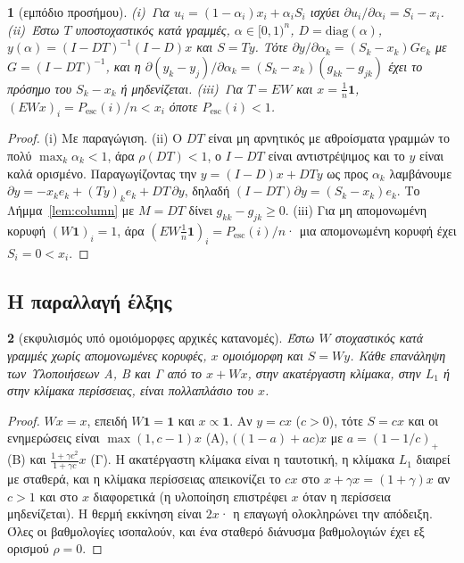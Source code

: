 \documentclass[11pt,a4paper]{article}
\theoremstyle{definition}
\theoremstyle{plain}
\newcommand{\genpropname}{}
\newtheorem*{genprop}{\genpropname}
\newenvironment{prop}[1]{\renewcommand{\genpropname}{Πρόταση #1}\begin{genprop}}{\end{genprop}}
\newcommand{\Pesc}{P_{\mathrm{esc}}}
\newcommand{\diag}{\mathrm{diag}}
\newcommand{\one}{\mathbf{1}}
\begin{document}
\begin{prop}{E}[εμπόδιο προσήμου]
(i)~Για $u_i=(1-\alpha_i)x_i+\alpha_iS_i$ ισχύει $\partial u_i/\partial\alpha_i=S_i-x_i$. (ii)~Έστω $T$ υποστοχαστικός κατά γραμμές, $\alpha\in[0,1)^n$, $D=\diag(\alpha)$, $y(\alpha)=(I-DT)^{-1}(I-D)x$ και $S=Ty$. Τότε $\partial y/\partial\alpha_k=(S_k-x_k)Ge_k$ με $G=(I-DT)^{-1}$, και η $\partial(y_k-y_j)/\partial\alpha_k=(S_k-x_k)(g_{kk}-g_{jk})$ έχει το πρόσημο του $S_k-x_k$ ή μηδενίζεται. (iii)~Για $T=EW$ και $x=\tfrac1n\one$, $(EWx)_i=\Pesc(i)/n<x_i$ όποτε $\Pesc(i)<1$.
\end{prop}

\begin{proof}
(i) Με παραγώγιση. (ii) Ο $DT$ είναι μη αρνητικός με αθροίσματα γραμμών το πολύ $\max_k\alpha_k<1$, άρα $\rho(DT)<1$, ο $I-DT$ είναι αντιστρέψιμος και το $y$ είναι καλά ορισμένο. Παραγωγίζοντας την $y=(I-D)x+DTy$ ως προς $\alpha_k$ λαμβάνουμε $\partial y=-x_ke_k+(Ty)_ke_k+DT\,\partial y$, δηλαδή $(I-DT)\partial y=(S_k-x_k)e_k$. Το Λήμμα~\ref{lem:column} με $M=DT$ δίνει $g_{kk}-g_{jk}\ge0$. (iii) Για μη απομονωμένη κορυφή $(W\one)_i=1$, άρα $(EW\tfrac1n\one)_i=\Pesc(i)/n$· μια απομονωμένη κορυφή έχει $S_i=0<x_i$.
\end{proof}

\subsection{Η παραλλαγή έλξης}

\begin{prop}{F}[εκφυλισμός υπό ομοιόμορφες αρχικές κατανομές]
Έστω $W$ στοχαστικός κατά γραμμές χωρίς απομονωμένες κορυφές, $x$ ομοιόμορφη και $S=Wy$. Κάθε επανάληψη των Υλοποιήσεων Α, Β και Γ από το $x+Wx$, στην ακατέργαστη κλίμακα, στην $L_1$ ή στην κλίμακα περίσσειας, είναι πολλαπλάσιο του $x$.
\end{prop}

\begin{proof}
$Wx=x$, επειδή $W\one=\one$ και $x\propto\one$. Αν $y=cx$ ($c>0$), τότε $S=cx$ και οι ενημερώσεις είναι $\max(1,c-1)x$ (Α), $\big((1-a)+ac\big)x$ με $a=(1-1/c)_+$ (Β) και $\frac{1+\gamma c^2}{1+\gamma c}x$ (Γ). Η ακατέργαστη κλίμακα είναι η ταυτοτική, η κλίμακα $L_1$ διαιρεί με σταθερά, και η κλίμακα περίσσειας απεικονίζει το $cx$ στο $x+\gamma x=(1+\gamma)x$ αν $c>1$ και στο $x$ διαφορετικά (η υλοποίηση επιστρέφει $x$ όταν η περίσσεια μηδενίζεται). Η θερμή εκκίνηση είναι $2x$· η επαγωγή ολοκληρώνει την απόδειξη. Όλες οι βαθμολογίες ισοπαλούν, και ένα σταθερό διάνυσμα βαθμολογιών έχει εξ ορισμού $\rho=0$.
\end{proof}
\end{document}
